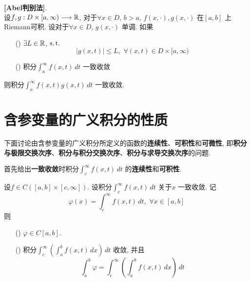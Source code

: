 	\newpage
	
	\begin{proposition}\label{prop A.3.4}
		\textbf{[Abel判别法]}. \\
		设$f , g : D \times [a , \infty) \longrightarrow \mathbb{R}$, 对于$\forall x \in D$, $b > a$, $f(x , \cdot) , g(x , \cdot)$ 在$[a , b]$ 上Riemann可积. 设对于$\forall x \in D$, $g(x , \cdot)$ 单调. 如果
		\begin{enumerate}
			\item[(\rmnum{1})] $\exists L \in \mathbb{R}$, $\operatorname{s.t.}$
			\[ \left| g(x , t) \right| \leq L , \,\, \forall (x  , t) \in D \times [a , \infty) \]
			
			\item[(\rmnum{2})] 积分$\int_{a}^\infty f(x , t) \, dt$ 一致收敛
		\end{enumerate}
		则积分$\int_{a}^{\infty} f(x , t) g(x , t) \, dt$ 一致收敛.
	\end{proposition}

\newpage

\section{含参变量的广义积分的性质}
	下面讨论由含参变量的广义积分所定义的函数的\textbf{连续性}、\textbf{可积性}和\textbf{可微性}, 即\textbf{积分与极限交换次序}、\textbf{积分与积分交换次序}、\textbf{积分与求导交换次序}的问题. 
	
	\vspace{1em}
	
	首先给出\textbf{一致收敛}时积分$\int_{c}^{\infty} f(x , t) \, dt$ 的\textbf{连续性}和\textbf{可积性}. 
	
	\begin{proposition}\label{prop A.4.1}
		设$f \in C([a , b] \times [c , \infty])$. 设积分$\int_{c}^{\infty} f(x , t) \, dt$ 关于$x$ 一致收敛. 记
		\[ \varphi(x) = \int_{c}^{\infty} f(x , t) \, dt , \,\, \forall x \in [a , b] \]
		则
		\begin{enumerate}
			\item[(\rmnum{1})] $\varphi \in C[a , b]$. 
			
			\item[(\rmnum{2})] 积分$\int_{c}^{\infty} \left( \int_{a}^b f(x , t) \, dx \right) \, dt$ 收敛, 并且
			\[ \int_{a}^b \varphi = \int_{c}^{\infty} \left( \int_{a}^b f(x , t) \, dx \right) \, dt \]
		\end{enumerate}
	\end{proposition}

	\vspace{12em}
	
